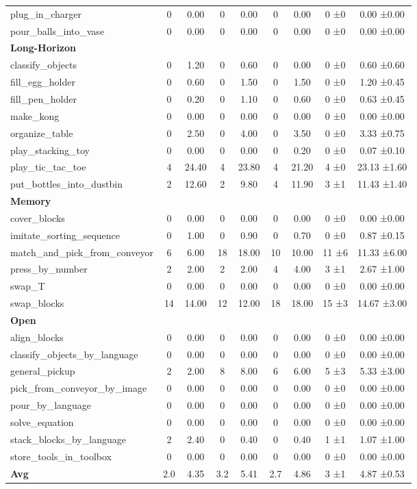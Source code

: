 \begin{table}[H]
{\begin{tabular}{l|c|c|c|c|c|c|c|c}
plug\_in\_charger & 0 & 0.00 & 0 & 0.00 & 0 & 0.00 & 0 ±0 & 0.00 ±0.00 \\
pour\_balls\_into\_vase & 0 & 0.00 & 0 & 0.00 & 0 & 0.00 & 0 ±0 & 0.00 ±0.00 \\
\hline
\multicolumn{9}{l}{\textbf{Long-Horizon}} \\
classify\_objects & 0 & 1.20 & 0 & 0.60 & 0 & 0.00 & 0 ±0 & 0.60 ±0.60 \\
fill\_egg\_holder & 0 & 0.60 & 0 & 1.50 & 0 & 1.50 & 0 ±0 & 1.20 ±0.45 \\
fill\_pen\_holder & 0 & 0.20 & 0 & 1.10 & 0 & 0.60 & 0 ±0 & 0.63 ±0.45 \\
make\_kong & 0 & 0.00 & 0 & 0.00 & 0 & 0.00 & 0 ±0 & 0.00 ±0.00 \\
organize\_table & 0 & 2.50 & 0 & 4.00 & 0 & 3.50 & 0 ±0 & 3.33 ±0.75 \\
play\_stacking\_toy & 0 & 0.00 & 0 & 0.00 & 0 & 0.20 & 0 ±0 & 0.07 ±0.10 \\
play\_tic\_tac\_toe & 4 & 24.40 & 4 & 23.80 & 4 & 21.20 & 4 ±0 & 23.13 ±1.60 \\
put\_bottles\_into\_dustbin & 2 & 12.60 & 2 & 9.80 & 4 & 11.90 & 3 ±1 & 11.43 ±1.40 \\
\hline
\multicolumn{9}{l}{\textbf{Memory}} \\
cover\_blocks & 0 & 0.00 & 0 & 0.00 & 0 & 0.00 & 0 ±0 & 0.00 ±0.00 \\
imitate\_sorting\_sequence & 0 & 1.00 & 0 & 0.90 & 0 & 0.70 & 0 ±0 & 0.87 ±0.15 \\
match\_and\_pick\_from\_conveyor & 6 & 6.00 & 18 & 18.00 & 10 & 10.00 & 11 ±6 & 11.33 ±6.00 \\
press\_by\_number & 2 & 2.00 & 2 & 2.00 & 4 & 4.00 & 3 ±1 & 2.67 ±1.00 \\
swap\_T & 0 & 0.00 & 0 & 0.00 & 0 & 0.00 & 0 ±0 & 0.00 ±0.00 \\
swap\_blocks & 14 & 14.00 & 12 & 12.00 & 18 & 18.00 & 15 ±3 & 14.67 ±3.00 \\
\hline
\multicolumn{9}{l}{\textbf{Open}} \\
align\_blocks & 0 & 0.00 & 0 & 0.00 & 0 & 0.00 & 0 ±0 & 0.00 ±0.00 \\
classify\_objects\_by\_language & 0 & 0.00 & 0 & 0.00 & 0 & 0.00 & 0 ±0 & 0.00 ±0.00 \\
general\_pickup & 2 & 2.00 & 8 & 8.00 & 6 & 6.00 & 5 ±3 & 5.33 ±3.00 \\
pick\_from\_conveyor\_by\_image & 0 & 0.00 & 0 & 0.00 & 0 & 0.00 & 0 ±0 & 0.00 ±0.00 \\
pour\_by\_language & 0 & 0.00 & 0 & 0.00 & 0 & 0.00 & 0 ±0 & 0.00 ±0.00 \\
solve\_equation & 0 & 0.00 & 0 & 0.00 & 0 & 0.00 & 0 ±0 & 0.00 ±0.00 \\
stack\_blocks\_by\_language & 2 & 2.40 & 0 & 0.40 & 0 & 0.40 & 1 ±1 & 1.07 ±1.00 \\
store\_tools\_in\_toolbox & 0 & 0.00 & 0 & 0.00 & 0 & 0.00 & 0 ±0 & 0.00 ±0.00 \\
\hline
\textbf{Avg} & 2.0 & 4.35 & 3.2 & 5.41 & 2.7 & 4.86 & 3 ±1 & 4.87 ±0.53 \\
\hline
\end{tabular}
}
\end{table}

